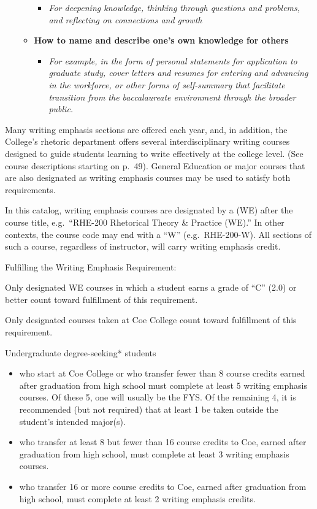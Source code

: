 \documentclass[
  letterpaper,
]{scrbook}
\providecommand{\tightlist}{%
  \setlength{\itemsep}{0pt}\setlength{\parskip}{0pt}}
\begin{document}
\begin{itemize}
\begin{itemize}
    \begin{itemize}
    \tightlist
    \item
      \emph{For deepening knowledge, thinking through questions and
      problems, and reflecting on connections and growth}
    \end{itemize}
  \item
    \textbf{How to name and describe one's own knowledge for others}

    \begin{itemize}
    \tightlist
    \item
      \emph{For example, in the form of personal statements for
      application to graduate study, cover letters and resumes for
      entering and advancing in the workforce, or other forms of
      self-summary that facilitate transition from the baccalaureate
      environment through the broader public.}
    \end{itemize}
  \end{itemize}
\end{itemize}

Many writing emphasis sections are offered each year, and, in addition,
the College's rhetoric department offers several interdisciplinary
writing courses designed to guide students learning to write effectively
at the college level. (See course descriptions starting on p.~49).
General Education or major courses that are also designated as writing
emphasis courses may be used to satisfy both requirements.

In this catalog, writing emphasis courses are designated by a (WE) after
the course title, e.g.~``RHE-200 Rhetorical Theory \& Practice (WE).''
In other contexts, the course code may end with a ``W''
(e.g.~RHE-200-W). All sections of such a course, regardless of
instructor, will carry writing emphasis credit.

Fulfilling the Writing Emphasis Requirement:

Only designated WE courses in which a student earns a grade of ``C''
(2.0) or better count toward fulfillment of this requirement.

Only designated courses taken at Coe College count toward fulfillment of
this requirement.

Undergraduate degree-seeking* students

\begin{itemize}
\item
  who start at Coe College or who transfer fewer than 8 course credits
  earned after graduation from high school must complete at least 5
  writing emphasis courses. Of these 5, one will usually be the FYS. Of
  the remaining 4, it is recommended (but not required) that at least 1
  be taken outside the student's intended major(s).
\item
  who transfer at least 8 but fewer than 16 course credits to Coe,
  earned after graduation from high school, must complete at least 3
  writing emphasis courses.
\item
  who transfer 16 or more course credits to Coe, earned after graduation
  from high school, must complete at least 2 writing emphasis credits.
\end{itemize}
\end{document}
